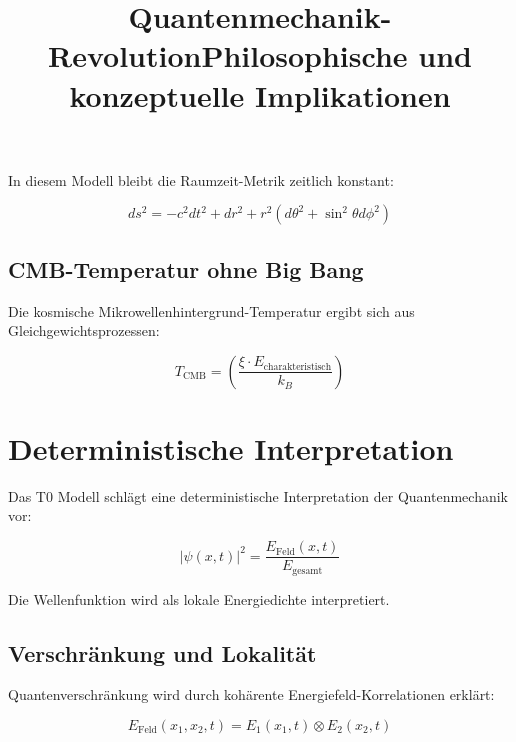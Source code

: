 \documentclass[12pt,a4paper]{report}
\begin{document}
	In diesem Modell bleibt die Raumzeit-Metrik zeitlich konstant:
	
	\begin{equation}
		ds^2 = -c^2 dt^2 + dr^2 + r^2(d\theta^2 + \sin^2\theta d\phi^2)
	\end{equation}
	
	\subsection{CMB-Temperatur ohne Big Bang}
	
	Die kosmische Mikrowellenhintergrund-Temperatur ergibt sich aus Gleichgewichtsprozessen:
	
	\begin{equation}
		T_{\text{CMB}} = \left(\frac{\xi \cdot E_{\text{charakteristisch}}}{k_B}\right)
	\end{equation}
	
	\title{Quantenmechanik-Revolution}
\maketitle
	
	\section{Deterministische Interpretation}
	
	Das T0 Modell schlägt eine deterministische Interpretation der Quantenmechanik vor:
	
	\begin{equation}
		|\psi(x,t)|^2 = \frac{E_{\text{Feld}}(x,t)}{E_{\text{gesamt}}}
	\end{equation}
	
	Die Wellenfunktion wird als lokale Energiedichte interpretiert.
	
	\subsection{Verschränkung und Lokalität}
	
	Quantenverschränkung wird durch kohärente Energiefeld-Korrelationen erklärt:
	
	\begin{equation}
		E_{\text{Feld}}(x_1, x_2, t) = E_1(x_1,t) \otimes E_2(x_2,t)
	\end{equation}
	
	\title{Philosophische und konzeptuelle Implikationen}
\maketitle
	
\end{document}

